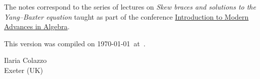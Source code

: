 

The notes correspond to the 
series of lectures on \emph{Skew braces and solutions to the Yang--Baxter equation}
taught as part of the conference \href{https://sites.google.com/view/itmaia/home?authuser=0}{Introduction to Modern Advances in Algebra}.



This version 
was compiled on \today~at~\currenttime.

\bigskip
\begin{flushright}
Ilaria Colazzo\\Exeter (UK)\par
\end{flushright}
